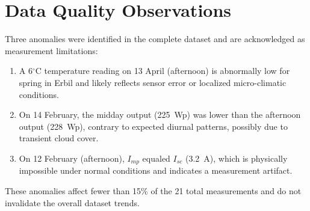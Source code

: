 \section{Data Quality Observations}

Three anomalies were identified in the complete dataset and are acknowledged as measurement limitations:
\begin{enumerate}
    \item A 6$^{\circ}$C temperature reading on 13 April (afternoon) is abnormally low for spring in Erbil and likely reflects sensor error or localized micro-climatic conditions.
    \item On 14 February, the midday output (225~Wp) was lower than the afternoon output (228~Wp), contrary to expected diurnal patterns, possibly due to transient cloud cover.
    \item On 12 February (afternoon), $I_{mp}$ equaled $I_{sc}$ (3.2~A), which is physically impossible under normal conditions and indicates a measurement artifact.
\end{enumerate}

These anomalies affect fewer than 15\% of the 21 total measurements and do not invalidate the overall dataset trends.
